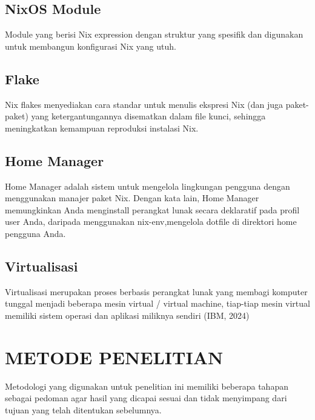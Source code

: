 \documentclass[10pt,]{report}
\begin{document}
\section{NixOS Module}
\begin{adjustwidth}{7mm}{}
	\vspace{-3mm}
	Module yang berisi Nix expression dengan struktur yang spesifik dan digunakan
	untuk membangun konfigurasi Nix yang utuh.
\end{adjustwidth}
\section{Flake}
\begin{adjustwidth}{7mm}{}
	\vspace{-3mm} Nix flakes menyediakan cara standar untuk menulis ekspresi Nix (dan juga paket-paket) yang ketergantungannya disematkan dalam file kunci, sehingga meningkatkan kemampuan reproduksi instalasi Nix.
\end{adjustwidth}
\section{Home Manager}
\begin{adjustwidth}{7mm}{}
	\vspace{-3mm}
	Home Manager adalah sistem untuk mengelola lingkungan pengguna dengan
	menggunakan manajer paket Nix. Dengan kata lain, Home Manager memungkinkan
	Anda menginstall perangkat lunak secara deklaratif pada profil user Anda,
	daripada menggunakan nix-env,mengelola dotfile di direktori home pengguna
	Anda.
\end{adjustwidth}
\section{Virtualisasi}
\begin{adjustwidth}{7mm}{}
	\vspace{-3mm}
	Virtualisasi merupakan proses berbasis perangkat lunak yang membagi komputer
	tunggal menjadi beberapa mesin virtual / virtual machine, tiap-tiap mesin
	virtual memiliki sistem operasi dan aplikasi miliknya sendiri (IBM, 2024)
\end{adjustwidth}


\chapter{METODE PENELITIAN}
Metodologi yang digunakan untuk penelitian ini memiliki beberapa tahapan
sebagai pedoman agar hasil yang dicapai sesuai dan tidak menyimpang dari tujuan
yang telah ditentukan sebelumnya.\\
\end{document}
